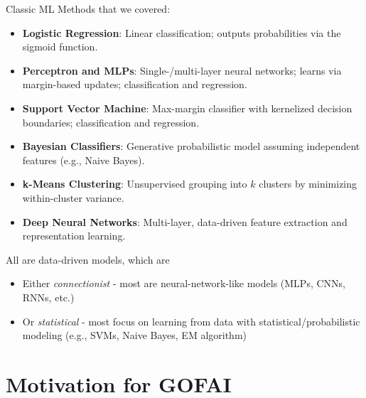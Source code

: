 \documentclass[german,10pt]{beamer}
\begin{document}
\begin{frame}{Classic ML Methods that we covered:}
  \begin{itemize}
    \item \textbf{Logistic Regression}: Linear classification; outputs probabilities via the sigmoid function.
    \item \textbf{Perceptron and MLPs}: Single-/multi-layer neural networks; learns via margin-based updates; classification and regression. 
    \item \textbf{Support Vector Machine}: Max-margin classifier with kernelized decision boundaries; classification and regression.
    \item \textbf{Bayesian  Classifiers}: Generative probabilistic model assuming independent features (e.g., Naive Bayes).
    \item \textbf{k-Means Clustering}: Unsupervised grouping into \(k\) clusters by minimizing within-cluster variance.
    \item \textbf{Deep Neural Networks}: Multi-layer, data-driven feature extraction and representation learning.
  \end{itemize}
  \begin{alertblock} { All are data-driven models, which are }
  \begin{itemize}
      \item  Either \textit{connectionist} - most are neural-network-like models (MLPs, CNNs, RNNs, etc.)
      \item  Or \textit{statistical} - most focus on learning from data with statistical/probabilistic modeling (e.g., SVMs, Naive Bayes, EM algorithm)
  \end{itemize}
    
  \end{alertblock}
\end{frame}

\section{Motivation for GOFAI}
\end{document}
